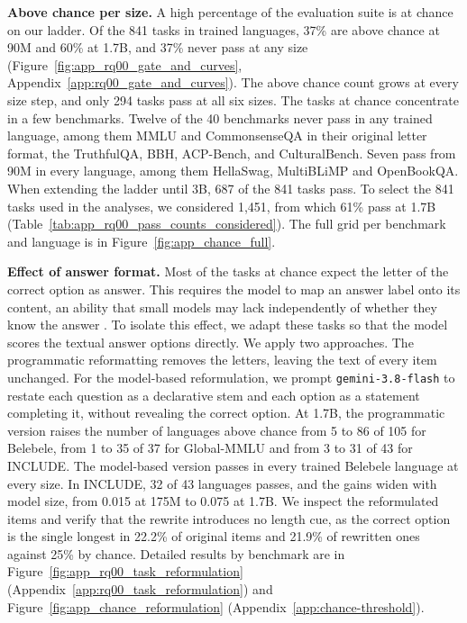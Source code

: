 \textbf{Above chance per size.} 
A high percentage of the evaluation suite is at chance on our ladder. Of the 841 tasks in trained languages, 37\% are above chance at 90M and 60\% at 1.7B, and 37\% never pass at any size (Figure~\ref{fig:app_rq00_gate_and_curves}, Appendix~\ref{app:rq00_gate_and_curves}). The above chance count grows at every size step, and only 294 tasks pass at all six sizes.
The tasks at chance concentrate in a few benchmarks. Twelve of the 40 benchmarks never pass in any trained language, among them MMLU and CommonsenseQA in their original letter format, the TruthfulQA, BBH, ACP-Bench, and CulturalBench. Seven pass from 90M in every language, among them HellaSwag, MultiBLiMP and OpenBookQA.
When extending the ladder until 3B, 687 of the 841 tasks pass.
To select the 841 tasks used in the analyses, we considered 1,451, from which 61\% pass at 1.7B (Table~\ref{tab:app_rq00_pass_counts_considered}).
The full grid per benchmark and language is in Figure~\ref{fig:app_chance_full}. 


\textbf{Effect of answer format.}
Most of the tasks at chance expect the letter of the correct option as answer. This requires the model to map an answer label onto its content, an ability that small models may lack independently of whether they know the answer \citeneeded. %
To isolate this effect, we adapt these tasks so that the model scores the textual answer options directly.
We apply two approaches. The programmatic reformatting removes the letters, leaving the text of every item unchanged.
For the model-based reformulation, we prompt \texttt{gemini-3.8-flash} \citep{gemini_team_gemini_2024} to restate each question as a declarative stem and each option as a statement completing it, without revealing the correct option.
At 1.7B, the programmatic version raises the number of languages above chance from 5 to 86 of 105 for Belebele, from 1 to 35 of 37 for Global-MMLU and from 3 to 31 of 43 for INCLUDE. The model-based version passes in every trained Belebele language at every size. In INCLUDE, 32 of 43 languages  passes, and the gains widen with model size, from 0.015 at 175M to 0.075 at 1.7B. We inspect the reformulated items and verify that the rewrite introduces no length cue, as the correct option is the single longest in 22.2\% of original items and 21.9\% of rewritten ones against 25\% by chance. Detailed results by benchmark are in Figure~\ref{fig:app_rq00_task_reformulation} (Appendix~\ref{app:rq00_task_reformulation}) and Figure~\ref{fig:app_chance_reformulation} (Appendix~\ref{app:chance-threshold}).

